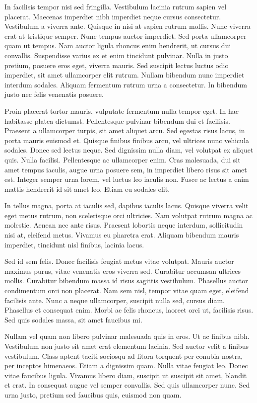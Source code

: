 In facilisis tempor nisi sed fringilla. Vestibulum lacinia rutrum sapien vel placerat. Maecenas imperdiet nibh imperdiet neque cursus consectetur. Vestibulum a viverra ante. Quisque in nisi at sapien rutrum mollis. Nunc viverra erat at tristique semper. Nunc tempus auctor imperdiet. Sed porta ullamcorper quam ut tempus. Nam auctor ligula rhoncus enim hendrerit, ut cursus dui convallis. Suspendisse varius ex et enim tincidunt pulvinar. Nulla in justo pretium, posuere eros eget, viverra mauris. Sed suscipit lectus luctus odio imperdiet, sit amet ullamcorper elit rutrum. Nullam bibendum nunc imperdiet interdum sodales. Aliquam fermentum rutrum urna a consectetur. In bibendum justo nec felis venenatis posuere.

Proin placerat tortor mauris, vulputate fermentum nulla tempor eget. In hac habitasse platea dictumst. Pellentesque pulvinar bibendum dui et facilisis. Praesent a ullamcorper turpis, sit amet aliquet arcu. Sed egestas risus lacus, in porta mauris euismod et. Quisque finibus finibus arcu, vel ultrices nunc vehicula sodales. Donec sed lectus neque. Sed dignissim nulla diam, vel volutpat ex aliquet quis. Nulla facilisi. Pellentesque ac ullamcorper enim. Cras malesuada, dui sit amet tempus iaculis, augue urna posuere sem, in imperdiet libero risus sit amet est. Integer semper urna lorem, vel luctus leo iaculis non. Fusce ac lectus a enim mattis hendrerit id sit amet leo. Etiam eu sodales elit.

In tellus magna, porta at iaculis sed, dapibus iaculis lacus. Quisque viverra velit eget metus rutrum, non scelerisque orci ultricies. Nam volutpat rutrum magna ac molestie. Aenean nec ante risus. Praesent lobortis neque interdum, sollicitudin nisi at, eleifend metus. Vivamus eu pharetra erat. Aliquam bibendum mauris imperdiet, tincidunt nisl finibus, lacinia lacus.

Sed id sem felis. Donec facilisis feugiat metus vitae volutpat. Mauris auctor maximus purus, vitae venenatis eros viverra sed. Curabitur accumsan ultrices mollis. Curabitur bibendum massa id risus sagittis vestibulum. Phasellus auctor condimentum orci non placerat. Nam sem nisl, tempor vitae quam eget, eleifend facilisis ante. Nunc a neque ullamcorper, suscipit nulla sed, cursus diam. Phasellus et consequat enim. Morbi ac felis rhoncus, laoreet orci ut, facilisis risus. Sed quis sodales massa, sit amet faucibus mi.

Nullam vel quam non libero pulvinar malesuada quis in eros. Ut ac finibus nibh. Vestibulum non justo sit amet erat elementum lacinia. Sed auctor velit a finibus vestibulum. Class aptent taciti sociosqu ad litora torquent per conubia nostra, per inceptos himenaeos. Etiam a dignissim quam. Nulla vitae feugiat leo. Donec vitae faucibus ligula. Vivamus libero diam, suscipit ut suscipit sit amet, blandit et erat. In consequat augue vel semper convallis. Sed quis ullamcorper nunc. Sed urna justo, pretium sed faucibus quis, euismod non quam.

